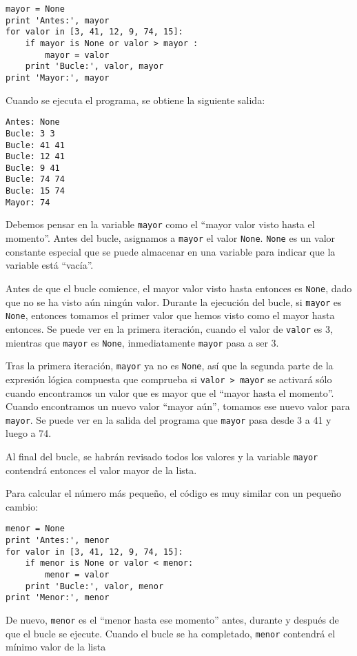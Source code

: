 \beforeverb
\begin{verbatim}
mayor = None
print 'Antes:', mayor
for valor in [3, 41, 12, 9, 74, 15]:
    if mayor is None or valor > mayor :
        mayor = valor
    print 'Bucle:', valor, mayor
print 'Mayor:', mayor
\end{verbatim}
\afterverb
%
Cuando se ejecuta el programa, se obtiene la siguiente salida:

\beforeverb
\begin{verbatim}
Antes: None
Bucle: 3 3
Bucle: 41 41
Bucle: 12 41
Bucle: 9 41
Bucle: 74 74
Bucle: 15 74
Mayor: 74
\end{verbatim}
\afterverb
%
Debemos pensar en la variable {\tt mayor} como
el ``mayor valor visto hasta el momento''.
Antes del bucle, asignamos a {\tt mayor} el valor {\tt None}.
{\tt None} es un valor constante especial que se puede
almacenar en una variable para indicar
que la variable está ``vacía''.

Antes de que el bucle comience, el mayor valor visto hasta entonces
es {\tt None}, dado que no se ha visto aún ningún valor. Durante la
ejecución del bucle, si {\tt mayor} es {\tt None}, entonces
tomamos el primer valor que hemos visto como el mayor hasta entonces. Se puede ver en
la primera iteración, cuando el valor de {\tt valor} es 3,
mientras que {\tt mayor} es {\tt None}, inmediatamente
{\tt mayor} pasa a ser 3.

Tras la primera iteración, {\tt mayor} ya no es {\tt None},
así que la segunda parte de la expresión lógica compuesta que comprueba
si {\tt valor > mayor} se activará sólo cuando encontramos un valor que es
mayor que el ``mayor hasta el momento''. Cuando encontramos un nuevo valor ``mayor aún'',
tomamos ese nuevo valor para {\tt mayor}. Se puede ver en la salida
del programa que {\tt mayor} pasa desde 3 a 41 y luego a 74.

Al final del bucle, se habrán revisado todos los valores y la
variable {\tt mayor} contendrá entonces el valor mayor de
la lista.

Para calcular el número más pequeño, el código es muy similar con un
pequeño cambio:

\beforeverb
\begin{verbatim}
menor = None
print 'Antes:', menor
for valor in [3, 41, 12, 9, 74, 15]:
    if menor is None or valor < menor:
        menor = valor
    print 'Bucle:', valor, menor
print 'Menor:', menor
\end{verbatim}
\afterverb
%
De nuevo, {\tt menor} es el ``menor hasta ese momento'' antes, durante y después de
que el bucle se ejecute. Cuando el bucle se ha completado, {\tt menor} contendrá
el mínimo valor de la lista

